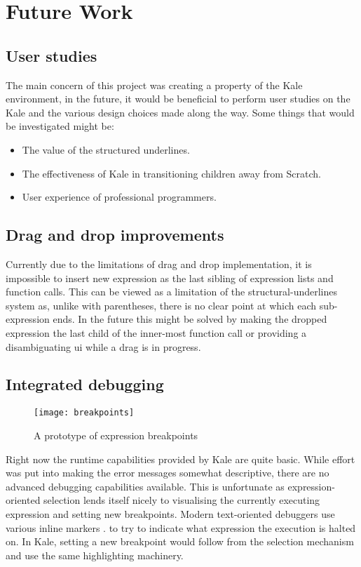 \section{Future Work}

\subsection{User studies}
The main concern of this project was creating a property of the Kale
environment, in the future, it would be beneficial to perform user studies on
the Kale and the various design choices made along the way. Some things that
would be investigated might be:

\begin{itemize}[noitemsep]
	\item The value of the structured underlines.
	\item The effectiveness of Kale in transitioning children away from Scratch.
	\item User experience of professional programmers.
\end{itemize}

\subsection{Drag and drop improvements}
Currently due to the limitations of drag and drop implementation, it is
impossible to insert new expression as the last sibling of expression lists
and function calls. This can be viewed as a limitation of the
structural-underlines system as, unlike with parentheses, there is no
clear point at which each sub-expression ends. In the future this might be
solved by making the dropped expression the last child of the inner-most
function call or providing a disambiguating \ac{ui} while a drag is in progress.

\subsection{Integrated debugging}
\begin{wrapfigure}{r}{6cm}
	\texttt{[image: breakpoints]}
	\caption{A prototype of expression breakpoints}
\end{wrapfigure}
Right now the runtime capabilities provided by Kale are quite basic. While
effort was put into making the error messages somewhat descriptive, there
are no advanced debugging capabilities available. This is unfortunate as
expression-oriented selection lends itself nicely to visualising the currently
executing expression and setting new breakpoints. Modern text-oriented debuggers
use various inline markers
.
to try to indicate what expression the execution is halted on. In Kale,
setting a new breakpoint would follow from the selection mechanism and use the
same highlighting machinery.

